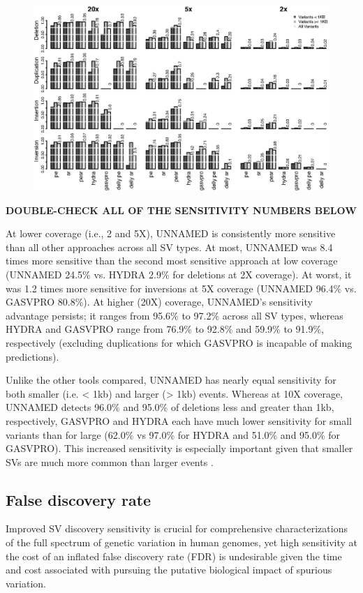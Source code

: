 \documentclass[11pt]{article}
\begin{document}
\begin{figure}
\includegraphics[width=6.5in]{R/ss_sl_s-un_hy_gv_dl-r10x.eps}
\end{figure}

\textbf{DOUBLE-CHECK ALL OF THE SENSITIVITY NUMBERS BELOW}

At lower coverage (i.e., 2 and 5X), UNNAMED is consistently more sensitive 
than all other approaches across all SV types. At most, UNNAMED was 
8.4 times more sensitive than the second most
sensitive approach at low coverage (UNNAMED 24.5\% vs. HYDRA 2.9\% for deletions
at 2X coverage). At worst, it was 1.2 times more sensitive for inversions at
5X coverage (UNNAMED 96.4\% vs. GASVPRO 80.8\%). At higher (20X) coverage, 
UNNAMED's sensitivity advantage persists; it ranges from 95.6\% to 97.2\% 
across all SV types, whereas HYDRA and GASVPRO range from 76.9\% to 92.8\% and
59.9\% to 91.9\%, respectively (excluding duplications for which GASVPRO is
incapable of making predictions).

Unlike the other tools compared, UNNAMED has nearly equal sensitivity for 
both smaller (i.e. < 1kb) and larger (> 1kb) events. Whereas at 10X coverage,
UNNAMED detects 96.0\% and 95.0\% of deletions less and greater than 1kb, 
respectively, GASVPRO and HYDRA each have much lower sensitivity for small
variants than for large (62.0\% vs 97.0\% for HYDRA and 51.0\% and 95.0\% for
GASVPRO). This increased sensitivity is especially important given that smaller
SVs are much more common than larger events \cite{mills2011}.


\subsection{False discovery rate}
Improved SV discovery sensitivity is crucial for comprehensive characterizations
of the full spectrum of genetic variation in human genomes, yet high
sensitivity at the cost of an inflated false discovery rate (FDR) is
undesirable given the time and cost associated with pursuing the putative 
biological impact of spurious variation.
\end{document}
